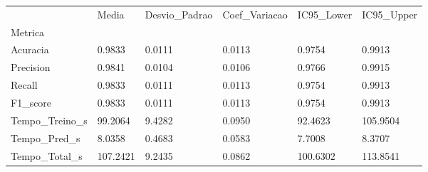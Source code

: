 \begin{tabular}{llllll}
\toprule
 & Media & Desvio_Padrao & Coef_Variacao & IC95_Lower & IC95_Upper \\
Metrica &  &  &  &  &  \\
\midrule
Acuracia & 0.9833 & 0.0111 & 0.0113 & 0.9754 & 0.9913 \\
Precision & 0.9841 & 0.0104 & 0.0106 & 0.9766 & 0.9915 \\
Recall & 0.9833 & 0.0111 & 0.0113 & 0.9754 & 0.9913 \\
F1_score & 0.9833 & 0.0111 & 0.0113 & 0.9754 & 0.9913 \\
Tempo_Treino_s & 99.2064 & 9.4282 & 0.0950 & 92.4623 & 105.9504 \\
Tempo_Pred_s & 8.0358 & 0.4683 & 0.0583 & 7.7008 & 8.3707 \\
Tempo_Total_s & 107.2421 & 9.2435 & 0.0862 & 100.6302 & 113.8541 \\
\bottomrule
\end{tabular}
